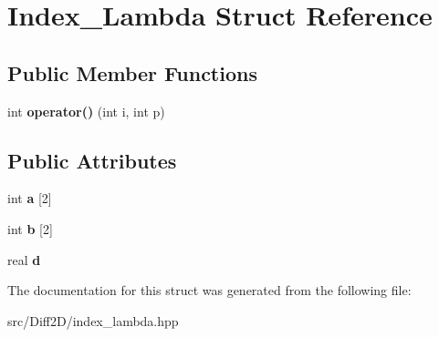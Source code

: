 \hypertarget{structIndex__Lambda}{\section{Index\-\_\-\-Lambda Struct Reference}
\label{structIndex__Lambda}
}
\subsection*{Public Member Functions}
\begin{DoxyCompactItemize}
\item 
\hypertarget{structIndex__Lambda_af8225252f38290763a8aae14a0660a02}{int {\bfseries operator()} (int i, int p)}\label{structIndex__Lambda_af8225252f38290763a8aae14a0660a02}

\end{DoxyCompactItemize}
\subsection*{Public Attributes}
\begin{DoxyCompactItemize}
\item 
\hypertarget{structIndex__Lambda_acdf68b7c6f870f4eeb4ee9d8183e0c73}{int {\bfseries a} \mbox{[}2\mbox{]}}\label{structIndex__Lambda_acdf68b7c6f870f4eeb4ee9d8183e0c73}

\item 
\hypertarget{structIndex__Lambda_aaa095d0d1b30bc698d5a816ff0199951}{int {\bfseries b} \mbox{[}2\mbox{]}}\label{structIndex__Lambda_aaa095d0d1b30bc698d5a816ff0199951}

\item 
\hypertarget{structIndex__Lambda_a34e9306034a5059d37f4ab53d79ea5c7}{real {\bfseries d}}\label{structIndex__Lambda_a34e9306034a5059d37f4ab53d79ea5c7}

\end{DoxyCompactItemize}


The documentation for this struct was generated from the following file\-:\begin{DoxyCompactItemize}
\item 
src/\-Diff2\-D/index\-\_\-lambda.\-hpp\end{DoxyCompactItemize}
